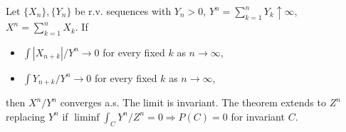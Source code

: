 Let $\{X_n\},\{Y_n\}$ be r.v. sequences with $Y_n>0$, $Y^n=\sum_{k=1}^n Y_k\uparrow\infty$, $X^n=\sum_{k=1}^n X_k$. If
\begin{itemize}
\item[(i)] $\int|X_{n+k}|/Y^n\to 0$ for every fixed $k$ as $n\to\infty$,
\item[(ii)] $\int Y_{n+k}/Y^n\to 0$ for every fixed $k$ as $n\to\infty$,
\end{itemize}
then $X^n/Y^n$ converges a.s. The limit is invariant. The theorem extends to $Z^n$ replacing $Y^n$ if $\liminf\int_C Y^n/Z^n=0\Rightarrow P(C)=0$ for invariant $C$.
